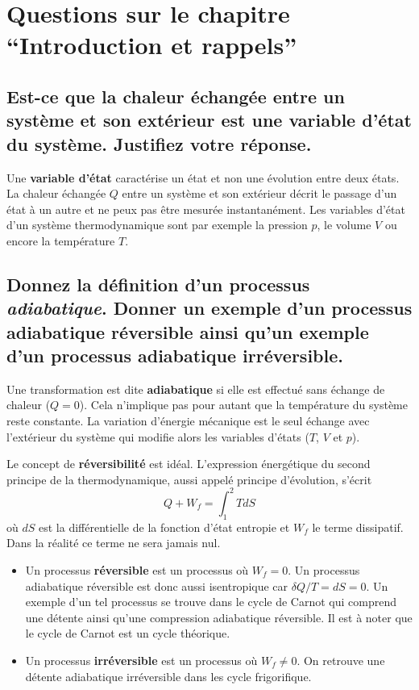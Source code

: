 \section{Questions sur le chapitre ``Introduction et rappels''}
\subsection{Est-ce que la chaleur échangée entre un système et son extérieur est une variable d'état du système. Justifiez votre réponse.}
Une \textbf{variable d'état} caractérise un état et non une évolution entre deux états. La chaleur échangée $Q$ entre un système et son extérieur décrit le passage d'un état à un autre et ne peux pas être mesurée instantanément. Les variables d'état d'un système thermodynamique sont par exemple la pression $p$, le volume $V$ ou encore la température $T$. 

\subsection{Donnez la définition d'un processus \textit{adiabatique}. Donner un exemple d'un processus adiabatique réversible ainsi qu'un exemple d'un processus adiabatique irréversible.}
Une transformation est dite \textbf{adiabatique} si elle est effectué sans échange de chaleur ($Q = 0$). Cela n'implique pas pour autant que la température du système reste constante. La variation d'énergie mécanique est le seul échange avec l'extérieur du système qui modifie alors les variables d'états ($T$, $V$ et $p$).

Le concept de \textbf{réversibilité} est idéal. L'expression énergétique du second principe de la thermodynamique, aussi appelé principe d'évolution, s'écrit 
\begin{equation} Q + W_f = \int_1^2T dS \end{equation}
où $dS$ est la différentielle de la fonction d'état entropie et $W_f$ le terme dissipatif. Dans la réalité ce terme ne sera jamais nul. 
\begin{itemize}
	\item Un processus \textbf{réversible} est un processus où $W_f = 0$. Un processus adiabatique réversible est donc aussi isentropique car $\delta Q/T = dS = 0$. Un exemple d'un tel processus se trouve dans le cycle de Carnot qui comprend une détente ainsi qu'une compression adiabatique réversible. Il est à noter que le cycle de Carnot est un cycle théorique.
	\item Un processus \textbf{irréversible} est un processus où $W_f \neq 0$. On retrouve une détente adiabatique irréversible dans les cycle frigorifique. 
\end{itemize}

